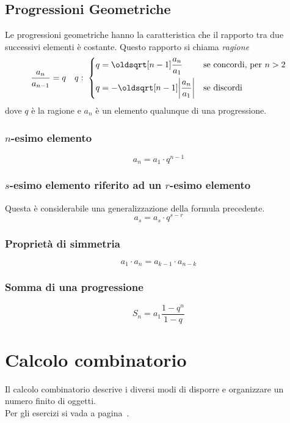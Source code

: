 \subsection{Progressioni Geometriche}
Le progressioni geometriche hanno la caratteristica che il rapporto tra due successivi elementi è
costante. Questo rapporto si chiama \emph{ragione}
\begin{equation*}
\frac{a_n}{a_{n-1}} = q \quad q:\;\begin{dcases}
q = \sqrt[n-1]{\frac{a_n}{a_1}} &\text{se concordi, per }n>2\\
q = -\sqrt[n-1]{\left\lvert\frac{a_n}{a_1}\right\rvert} &\text{se discordi}
\end{dcases}
\end{equation*}
dove $q$ è la ragione e $a_n$ è un elemento qualunque di una progressione.

\subsubsection{$n$-esimo elemento}
\begin{equation*}
a_n = a_1\cdot q^{n-1}
\end{equation*}

\subsubsection{$s$-esimo elemento riferito ad un $r$-esimo elemento}
Questa è considerabile una generalizzazione della formula precedente.
\begin{equation*}
a_s = a_s\cdot q^{s-r}
\end{equation*}

\subsubsection{Proprietà di simmetria}
\begin{equation*}
a_1\cdot a_n = a_{k-1}\cdot a_{n-k}
\end{equation*}

\subsubsection{Somma di una progressione}
\begin{equation*}
S_n = a_1\frac{1-q^n}{1-q}
\end{equation*}

\section{Calcolo combinatorio}\label{sec:calccomb}
Il calcolo combinatorio descrive i diversi modi di disporre e organizzare un numero finito di oggetti.
\\Per gli esercizi si vada a pagina~\pageref{ex:calccomb}.


